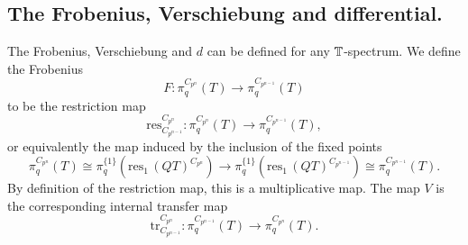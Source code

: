 \subsection{The Frobenius, Verschiebung and differential.}
The Frobenius, Verschiebung and $d$ can be defined for any
$\mathbb{T}$-spectrum. 
We define the Frobenius
\[
F:\pi_q^{C_{p^n}}(T)\to \pi_q^{C_{p^{n-1}}}(T)
\]
 to be the restriction map
\[
\mathrm{res}^{C_{p^{n}}}_{C_{p^{n-1}}}: \pi_q^{C_{p^{n}}}(T)
\to
\pi_q^{C_{p^{n-1}}}(T) ,
\]
or equivalently the map induced by the inclusion of the fixed points
\begin{equation}\label{eq:frobenius}
 \pi_q^{C_{p^{n}}}(T)\cong
\pi^{\{ 1 \}}_q(\mathrm{res}_1\,(QT)^{C_{p^{n}}})
\to \pi^{\{ 1 \}}_q(\mathrm{res}_1\,(QT)^{C_{p^{n-1}}}) \cong
\pi_q^{C_{p^{n-1}}}(T).
\end{equation}
By definition of the restriction map, this is a multiplicative map.
The map $V$ is the corresponding internal transfer map
\[
\mathrm{tr}^{C_{p^n}}_{C_{p^{n-1}}}:
\pi_q^{C_{p^{n-1}}}(T)
\to
\pi_q^{C_{p^{n}}}(T) .
\]


